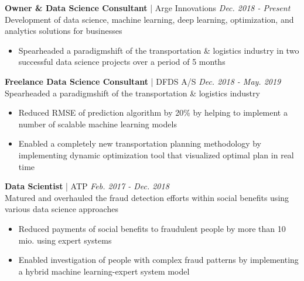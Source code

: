\documentclass[12pt,a4paper]{article}
\newcommand{\textline}[3]{\normalsize{\textbf{#1} | #2 \hfill \textit{#3}}}
\begin{document}
\textline{Owner \& Data Science Consultant}{Arge Innovations}{Dec. 2018 - Present}\\
Development of data science, machine learning, deep learning, optimization, and analytics solutions for businesses
\begin{itemize}[label=\textcolor{myblue}{\textbullet}]
    \vspace{-0.3cm}
    \item Spearheaded a paradigmshift of the transportation \& logistics industry in two successful data science projects over a period of 5 months
\end{itemize}

\textline{Freelance Data Science Consultant}{DFDS A/S}{Dec. 2018 - May. 2019}\\
Spearheaded a paradigmshift of the transportation \& logistics industry
\begin{itemize}[label=\textcolor{myblue}{\textbullet}]
    \vspace{-0.3cm}
    \item Reduced RMSE of prediction algorithm by 20\% by helping to implement a number of scalable machine learning models
    \vspace{-0.3cm}
    \item Enabled a completely new transportation planning methodology by implementing dynamic optimization tool that visualized optimal plan in real time
\end{itemize}

\textline{Data Scientist}{ATP}{Feb. 2017 - Dec. 2018}\\
Matured and overhauled the fraud detection efforts within social benefits using various data science approaches
\begin{itemize}[label=\textcolor{myblue}{\textbullet}]
    \vspace{-0.3cm}
    \item Reduced payments of social benefits to fraudulent people by more than 10 mio. using expert
systems
    \vspace{-0.3cm}
    \item Enabled investigation of people with complex fraud patterns by implementing a hybrid machine
learning-expert system model
    \vspace{-0.3cm}
\end{itemize}
\end{document}

